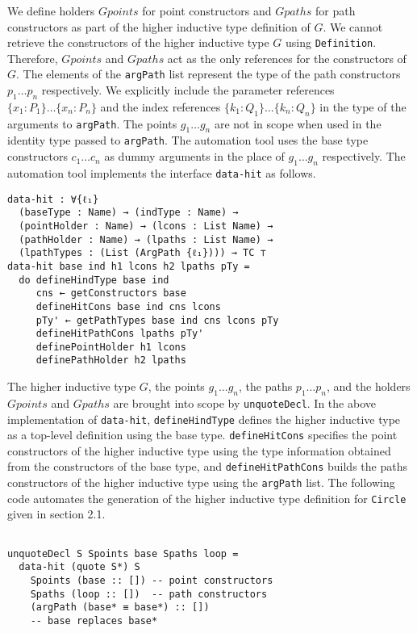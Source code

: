 \documentclass[sigplan,10pt]{acmart}
\begin{document}
We define holders $Gpoints$ for point constructors and $Gpaths$ for path constructors as part of the higher inductive type definition of $G$. We cannot retrieve the constructors of the higher inductive type $G$ using {\tt Definition}. Therefore, $Gpoints$ and $Gpaths$ act as the only references for the constructors of $G$. The elements of the {\tt argPath} list represent the type of the path constructors $p_1 \ldots p_n$ respectively. We explicitly include the parameter references $\{x_1 : P_1\} \ldots \{x_n : P_n\}$ and the index references $\{k_1 : Q_1\} \ldots \{k_n : Q_n\}$ in the type of the arguments to {\tt argPath}. The points $g_1 \ldots g_n$ are not in scope when used in the identity type passed to {\tt argPath}. The automation tool uses the base type constructors $c_1 \ldots c_n$ as dummy arguments in the place of $g_1 \ldots g_n$ respectively. The automation tool implements the interface {\tt data-hit} as follows.

\begin{center}
\begingroup
\begin{BVerbatim}
data-hit : ∀{ℓ₁} 
  (baseType : Name) → (indType : Name) →
  (pointHolder : Name) → (lcons : List Name) →
  (pathHolder : Name) → (lpaths : List Name) →
  (lpathTypes : (List (ArgPath {ℓ₁}))) → TC ⊤
data-hit base ind h1 lcons h2 lpaths pTy =
  do defineHindType base ind
     cns ← getConstructors base
     defineHitCons base ind cns lcons
     pTy' ← getPathTypes base ind cns lcons pTy
     defineHitPathCons lpaths pTy'
     definePointHolder h1 lcons
     definePathHolder h2 lpaths
\end{BVerbatim}
\endgroup
\end{center}

The higher inductive type $G$, the points $g_1 \ldots g_n$, the paths $p_1 \ldots p_n$, and the holders $Gpoints$ and $Gpaths$ are brought into scope by {\tt unquoteDecl}. In the above implementation of {\tt data-hit}, {\tt defineHindType} defines the higher inductive type as a top-level definition using the base type. {\tt defineHitCons} specifies the point constructors of the higher inductive type using the type information obtained from the constructors of the base type, and {\tt defineHitPathCons} builds the paths constructors of the higher inductive type using the {\tt argPath} list. The following code automates the generation of the higher inductive type definition for {\tt Circle} given in section 2.1.
\begin{center}
\begingroup
\begin{BVerbatim}

unquoteDecl S Spoints base Spaths loop =
  data-hit (quote S*) S
    Spoints (base :: []) -- point constructors
    Spaths (loop :: [])  -- path constructors
    (argPath (base* ≡ base*) :: []) 
    -- base replaces base*

\end{BVerbatim}
\endgroup
\end{center}
\end{document}
